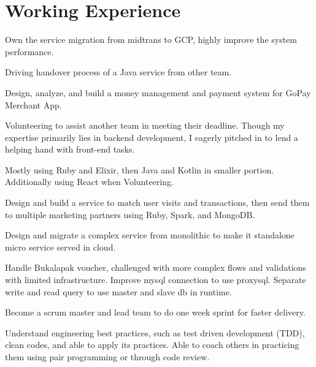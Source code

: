 \documentclass[letterpaper]{deedy-resume} %
\begin{document}
\hfill
\begin{minipage}[t]{0.66\textwidth} %


\section{Working Experience}

\vspace{\topsep} %
\begin{tightitemize}
\item Own the service migration from midtrans to GCP, highly improve the system performance.
\item Driving handover process of a Java service from other team.
\item Design, analyze, and build a money management and payment system for GoPay Merchant App.
\item Volunteering to assist another team in meeting their deadline. Though my expertise primarily lies in backend development, I eagerly pitched in to lend a helping hand with front-end tasks.
\item Mostly using Ruby and Elixir, then Java and Kotlin in smaller portion. Additionally using React when Volunteering.
\end{tightitemize}
\sectionspace

\begin{tightitemize}
\item Design and build a service to match user visits and transactions, then send them to multiple marketing partners using Ruby, Spark, and MongoDB.
\item Design and migrate a complex service from monolithic to make it standalone micro service served in cloud.
\item Handle Bukalapak voucher, challenged with more complex flows and validations with limited infrastructure. Improve mysql connection to use proxysql. Separate write and read query to use master and slave db in runtime.
\item Become a scrum master and lead team to do one week sprint for faster delivery.
\item Understand engineering best practices, such as test driven development (TDD), clean codes, and able to apply its practices. Able to coach others in practicing them using pair programming or through code review.
\end{tightitemize}
\sectionspace


\end{minipage}
\end{document}
